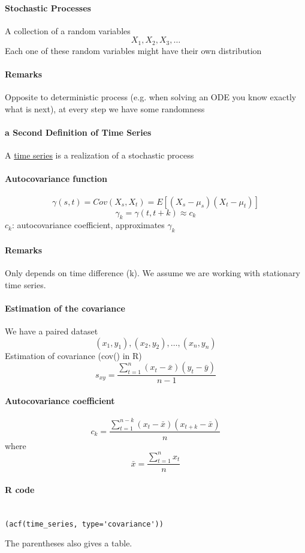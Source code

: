 \documentclass[11pt]{article}
\newcommand{\under}[1]{\underline{#1}}
\begin{document}
\paragraph{Stochastic Processes}
A collection of a random variables
$$X_1, X_2, X_3, \hdots$$
Each one of these random variables might have their own distribution
\paragraph{Remarks}
Opposite to deterministic process (e.g. when solving an ODE you know exactly what is next), at every step we have some randomness
\paragraph{a Second Definition of Time Series}
A \under{time series} is a realization of a stochastic process

\paragraph{Autocovariance function}
$$ \gamma(s,t) = Cov(X_s, X_t) = E[(X_s -  \mu_s)(X_t - \mu_t)]$$
$$ \gamma_k = \gamma(t, t+k) \approx c_k$$
$c_k$: autocovariance coefficient, approximates $\gamma_k$
\paragraph{Remarks}
Only depends on time difference (k). We assume we are working with stationary time series.

\paragraph{Estimation of the covariance}
We have a paired dataset
$$(x_1, y_1), (x_2, y_2), \hdots, (x_n, y_n)$$
Estimation of covariance (cov() in R)
$$s_{xy} = \frac{\sum_{t=1}^n(x_t - \bar{x})(y_t - \bar{y})}{n-1}$$

\paragraph{Autocovariance coefficient}
$$c_k = \frac{\sum_{t=1}^{n-k} (x_t - \bar{x})(x_{t+k} - \bar{x})}{n}$$
where
$$ \bar{x} = \frac{\sum_{t=1}^nx_t}{n}$$
\paragraph{R code}
\begin{align*}
\end{align*}
\begin{lstlisting}
(acf(time_series, type='covariance'))
\end{lstlisting}
The parentheses also gives a table. \\
\end{document}
